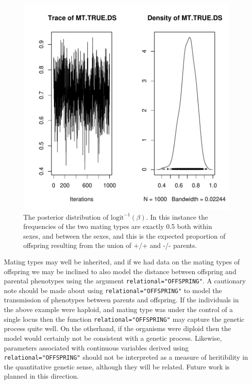 \documentclass{article}
\begin{document}
\begin{figure}[!h]
\begin{center}
\includegraphics{Tutorial-087}
\end{center}
\caption{The posterior distribution of $\textrm{logit}^{-1}(\beta)$.  In this instance the frequencies of the two mating types are exactly 0.5 both within sexes, and between the sexes, and this is the expected proportion of offspring resulting from the union of +/+ and -/- parents.}
\label{model.ass.mat}
\end{figure}

Mating types may well be inherited, and if we had data on the mating types of offspring we may be inclined to also model the distance between offspring and parental phenotypes using the argument \texttt{relational="OFFSPRING"}.  A cautionary note should be made about using \texttt{relational="OFFSPRING"} to model the transmission of phenotypes between parents and offspring.  If the individuals in the above example were haploid, and mating type was under the control of a single locus then the function \texttt{relational="OFFSPRING"} may capture the genetic process quite well.  On the otherhand, if the organisms were diploid then the model would certainly not be consistent with a genetic process.  Likewise, parameters associated with continuous variables derived using \texttt{relational="OFFSPRING"} should not be interpreted as a measure of heritibility in the quantitative genetic sense, although they will be related.  Future work is planned in this direction.
\end{document}
